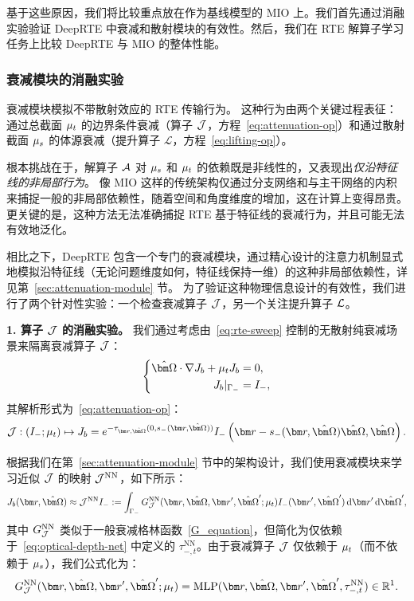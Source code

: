 基于这些原因，我们将比较重点放在作为基线模型的 MIO 上。我们首先通过消融实验验证 DeepRTE 中衰减和散射模块的有效性。然后，我们在 RTE 解算子学习任务上比较 DeepRTE 与 MIO 的整体性能。

\subsubsection{衰减模块的消融实验}

衰减模块模拟不带散射效应的 RTE 传输行为。
这种行为由两个关键过程表征：通过总截面 $\mu_t$ 的边界条件衰减（算子 $\mathcal{J}$，方程~\eqref{eq:attenuation-op}）和通过散射截面 $\mu_s$ 的体源衰减（提升算子 $\mathcal{L}$，方程~\eqref{eq:lifting-op}）。

根本挑战在于，解算子 $\mathcal{A}$ 对 $\mu_s$ 和 $\mu_t$ 的依赖既是非线性的，又表现出\emph{仅沿特征线的非局部行为}。
像 MIO 这样的传统架构仅通过分支网络和与主干网络的内积来捕捉一般的非局部依赖性，随着空间和角度维度的增加，这在计算上变得昂贵。更关键的是，这种方法无法准确捕捉 RTE 基于特征线的衰减行为，并且可能无法有效地泛化。

相比之下，DeepRTE 包含一个专门的衰减模块，通过精心设计的注意力机制显式地模拟沿特征线（无论问题维度如何，特征线保持一维）的这种非局部依赖性，详见第~\ref{sec:attenuation-module} 节。
为了验证这种物理信息设计的有效性，我们进行了两个针对性实验：一个检查衰减算子 $\mathcal{J}$，另一个关注提升算子 $\mathcal{L}$。

\textbf{1. 算子 $\mathcal{J}$ 的消融实验。}
我们通过考虑由~\eqref{eq:rte-sweep} 控制的无散射纯衰减场景来隔离衰减算子 $\mathcal{J}$：
\begin{equation}
    \left\{ %
    \begin{aligned}
        \bOmega \cdot \nabla J_b + \mut J_b & = 0,     \\
        J_b|_{\Gamma_{-}}                   & = I_{-},
    \end{aligned}
    \right. %
\end{equation}
其解析形式为~\eqref{eq:attenuation-op}：
\begin{equation}
    \J: (I_{-}; \mut) \mapsto J_b = e^{-\tau_{\br,\bOmega}(0,s_{-}(\br,\bOmega))} I_{-}\left(\br-s_{-}(\br, \bOmega)
    \bOmega, \bOmega\right).
\end{equation}

根据我们在第~\ref{sec:attenuation-module} 节中的架构设计，我们使用衰减模块来学习近似 $\mathcal{J}$ 的映射 $\mathcal{J}^{\text{NN}}$，如下所示：
\begin{equation}
    J_b(\br,\bOmega) \approx \J^{\text{NN}}I_{-} := \int_{\Gamma_{-}} G^{\text{NN}}_{\J}(\br,\bOmega, \br',\bOmega'; \mut) I_-(\br',\bOmega')\diff{\br'}\diff{\bOmega'},
\end{equation}
其中 $G^{\text{NN}}_{\mathcal{J}}$ 类似于一般衰减格林函数~\eqref{G_equation}，但简化为仅依赖于~\eqref{eq:optical-depth-net} 中定义的 $\tau^{\text{NN}}_{-,t}$。由于衰减算子 $\mathcal{J}$ 仅依赖于 $\mu_t$（而不依赖于 $\mu_s$），我们公式化为：
\begin{equation}
    G_{\J}^{\text{NN}}(\br,\bOmega, \br', \bOmega';\mut) = \text{MLP}(\br,\bOmega, \br', \bOmega', \tau^{\text{NN}}_{-,t}) \in \mathbb{R}^1.
\end{equation}

